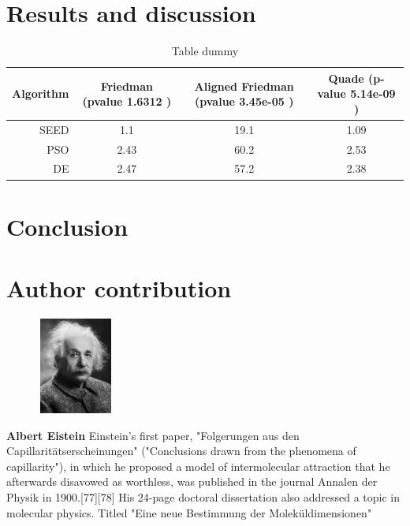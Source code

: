 \documentclass{SFEE}
\begin{document}
\section{Results and discussion}
\lipsum[18-25]
\begin{table}[htb]
     \caption{Table dummy}
    \footnotesize
    \center
    \begin{tabular}{rccc}
    \hline \hline
    Algorithm & Friedman (pvalue 1.6312 ) & Aligned Friedman  (pvalue 3.45e-05 ) & Quade (p-value 5.14e-09 )  \\
    \hline
     SEED & 1.1  & 19.1 & 1.09   \\
     \hline
     PSO  & 2.43 & 60.2 & 2.53   \\
     \hline
     DE   & 2.47 & 57.2 & 2.38  \\
    \hline

    \hline \hline
    \end{tabular}
  
    \end{table}
\section{Conclusion}
\lipsum[18-27]

 


\section*{Author contribution}

\begin{figure} 
    \includegraphics[width=1in,height=1.25in,clip,keepaspectratio]{Albert_Einstein_Head}
  \end{figure}\par
  \textbf{Albert Eistein} Einstein's first paper, "Folgerungen aus den Capillaritätserscheinungen" ("Conclusions drawn from the phenomena of capillarity"), in which he proposed a model of intermolecular attraction that he afterwards disavowed as worthless, was published in the journal Annalen der Physik in 1900.[77][78] His 24-page doctoral dissertation also addressed a topic in molecular physics. Titled "Eine neue Bestimmung der Moleküldimensionen"\par
\end{document}
